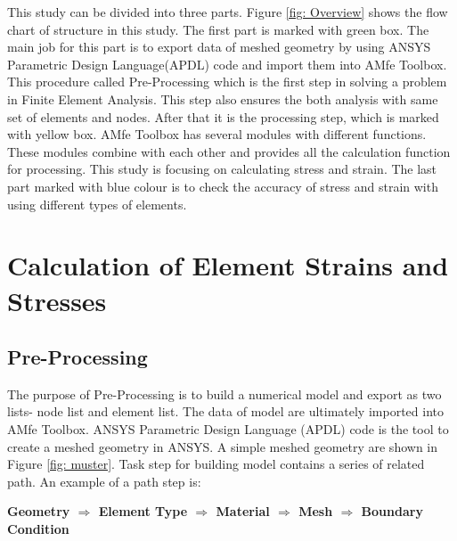 This study can be divided into three parts.  Figure \ref{fig: Overview} shows the flow chart of structure in this study. The first part is marked with green box. The main job for this part is to export data of meshed geometry by using ANSYS Parametric Design Language(APDL) code and import them into AMfe Toolbox. This procedure called Pre-Processing which is the first step in solving a problem in Finite Element Analysis. This step also ensures the both analysis with same set of elements and nodes. After that it is the processing step, which is marked with yellow box. AMfe Toolbox has several modules with different functions. These modules combine with each other and provides all the calculation function for processing. This study is focusing on calculating stress and strain. The last part marked with blue colour is to check the accuracy of stress and strain with using different types of elements.

\chapter{Calculation of Element Strains and Stresses}
\section{Pre-Processing}
The purpose of Pre-Processing is to build a numerical model and export as two lists- node list and element list.  The data of model are ultimately imported into AMfe Toolbox. ANSYS Parametric Design Language (APDL) code is the tool to create a meshed geometry in ANSYS. A simple meshed geometry are shown in Figure \ref{fig: muster}. Task step for building model contains a series of related path. An example of a path step is: 

\begin{center}
	\large{\textbf{Geometry $\Rightarrow$ Element Type $\Rightarrow$ Material $\Rightarrow$ Mesh
			$\Rightarrow$ Boundary Condition  }}
\end{center}

